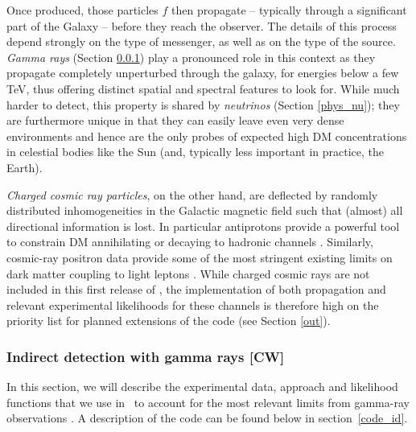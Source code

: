 Once produced, those particles $f$ then propagate -- typically through a significant part of 
the Galaxy --  before they reach the observer. The details of this process depend strongly 
on the type of messenger, as well as on the type of the source. {\it Gamma rays} (Section 
\ref{phys_ga}) play a pronounced role in this context as they propagate completely 
unperturbed through the galaxy, for energies below a few TeV, thus offering distinct 
spatial and spectral features to look for. While much harder to detect, this property is 
shared by {\it neutrinos} (Section \ref{phys_nu}); they are furthermore unique in that 
they can easily leave even very dense environments and hence are the only probes of 
expected high DM concentrations in celestial bodies like the Sun (and, 
typically less important in practice, the Earth). 

{\it Charged cosmic ray particles}, on the
other hand, are deflected by randomly distributed inhomogeneities in the Galactic 
magnetic field such that (almost) all directional information is lost. In particular antiprotons
provide a powerful tool to constrain DM annihilating or decaying to hadronic channels  
\cite{xxx}. Similarly, cosmic-ray positron data provide some of the most stringent existing 
limits on dark matter coupling to light leptons \cite{xxx}. While charged cosmic rays are not 
included in this first release of \DB, the implementation of both propagation and  relevant 
experimental likelihoods for these channels  is therefore high on the priority list for planned extensions of the code (see Section \ref{out}).






\subsubsection{Indirect detection with gamma rays {\bf [CW]}}
\label{phys_ga}

In this section, we will describe the experimental data, approach and
likelihood functions that we use in \GB\ to account for the most relevant
limits from gamma-ray observations .  A description of the code can be found
below in section~\ref{code_id}.

